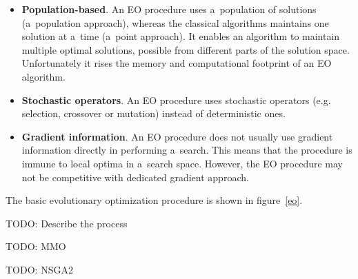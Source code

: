 \begin{itemize}
\item \textbf{Population-based}. An EO procedure uses a~population of
  solutions (a~population approach), whereas the classical algorithms
  maintains one solution at a~time (a~point approach). It enables an algorithm
  to maintain multiple optimal solutions, possible from different parts of the
  solution space. Unfortunately it rises the memory and computational
  footprint of an EO algorithm.
\item \textbf{Stochastic operators}. An EO procedure uses stochastic operators
  (e.g. selection, crossover or mutation) instead of deterministic ones.
\item \textbf{Gradient information}. An EO procedure does not usually use
  gradient information directly in performing a~search. This means that the
  procedure is immune to local optima in a~search space. However, the EO
  procedure may not be competitive with dedicated gradient approach.
\end{itemize}



The basic evolutionary optimization procedure is shown in figure~\ref{eo}.

TODO: Describe the process

TODO: MMO

TODO: NSGA2


\label{sec_drsa_in_moo}


